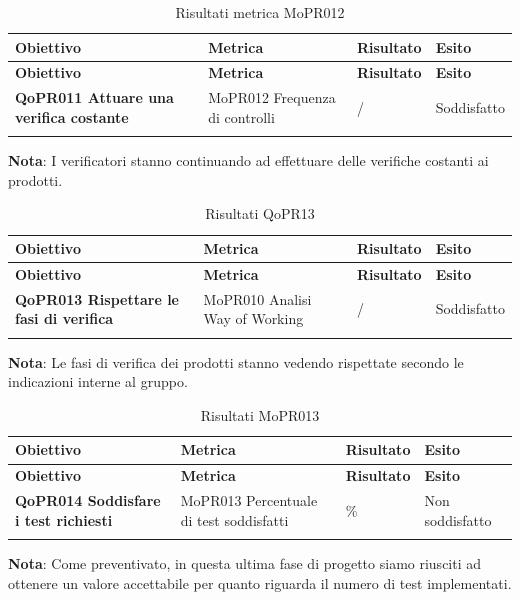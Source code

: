 \renewcommand{\arraystretch}{2} %
\begin{longtable}[H]{>{\centering\bfseries}m{5cm} >{\centering}m{5cm} >{\centering}m{2.5cm} >{\centering\arraybackslash}m{2.5cm}}  
  \rowcolor{lightgray}
  {\textbf{Obiettivo}} & {\textbf{Metrica}} & {\textbf{Risultato}} & {\textbf{Esito}}  \\
  \endfirsthead%
  \rowcolor{lightgray}
  {\textbf{Obiettivo}} & {\textbf{Metrica}} & {\textbf{Risultato}} & {\textbf{Esito}}  \\
  \endhead%
  \textbf{QoPR011 Attuare una verifica costante} & MoPR012 Frequenza di controlli & / & Soddisfatto \\
  \caption{Risultati metrica MoPR012}
  \label{tab:my-table}
\end{longtable}
\textbf{Nota}: I verificatori stanno continuando ad effettuare delle verifiche costanti ai prodotti.


\renewcommand{\arraystretch}{2} %
\begin{longtable}[H]{>{\centering\bfseries}m{5cm} >{\centering}m{5cm} >{\centering}m{2.5cm} >{\centering\arraybackslash}m{2.5cm}}  
  \rowcolor{lightgray}
  {\textbf{Obiettivo}} & {\textbf{Metrica}} & {\textbf{Risultato}} & {\textbf{Esito}}  \\
  \endfirsthead%
  \rowcolor{lightgray}
  {\textbf{Obiettivo}} & {\textbf{Metrica}} & {\textbf{Risultato}} & {\textbf{Esito}}  \\
  \endhead%
  \textbf{QoPR013 Rispettare le fasi di verifica} & MoPR010 Analisi Way of Working & / & Soddisfatto \\
  \caption{Risultati QoPR13}
  \label{tab:my-table}
\end{longtable}
\textbf{Nota}: Le fasi di verifica dei prodotti stanno vedendo rispettate secondo le indicazioni interne al gruppo.

\renewcommand{\arraystretch}{2} %
\begin{longtable}[H]{>{\centering\bfseries}m{5cm} >{\centering}m{5cm} >{\centering}m{2.5cm} >{\centering\arraybackslash}m{2.5cm}}  
  \rowcolor{lightgray}
  {\textbf{Obiettivo}} & {\textbf{Metrica}} & {\textbf{Risultato}} & {\textbf{Esito}}  \\
  \endfirsthead%
  \rowcolor{lightgray}
  {\textbf{Obiettivo}} & {\textbf{Metrica}} & {\textbf{Risultato}} & {\textbf{Esito}}  \\
  \endhead%
  \textbf{QoPR014 Soddisfare i test richiesti} & MoPR013 Percentuale di test soddisfatti & 85\% & Non soddisfatto \\
  \caption{Risultati MoPR013}
  \label{tab:my-table}
\end{longtable}
\textbf{Nota}:  Come preventivato, in questa ultima fase di progetto siamo riusciti ad ottenere un valore accettabile per quanto riguarda il numero di test implementati.

